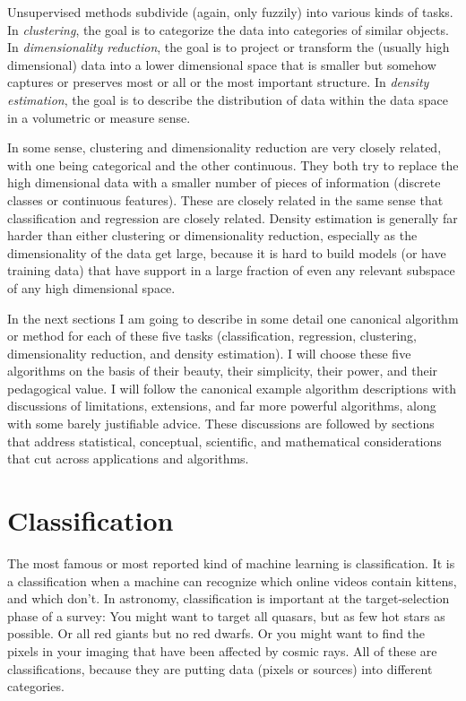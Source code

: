 \documentclass[12pt, twoside, letterpaper]{article}
\begin{document}
Unsupervised methods subdivide (again, only fuzzily) into various
kinds of tasks.
In \emph{clustering}, the goal is to categorize the data into categories
of similar objects.
In \emph{dimensionality reduction}, the goal is to project or
transform the (usually high dimensional) data into a lower dimensional
space that is smaller but somehow captures or preserves most or all or
the most important structure.
In \emph{density estimation}, the goal is to describe the distribution
of data within the data space in a volumetric or measure sense.

In some sense, clustering and dimensionality reduction are very closely
related, with one being categorical and the other continuous.
They both try to replace the high dimensional data with a smaller number of
pieces of information (discrete classes or continuous features).
These are closely related in the
same sense that classification and regression are closely related.
Density estimation is generally far harder than either clustering
or dimensionality reduction, especially as the dimensionality of the
data get large, because it is hard to build models (or have training
data) that have support in a large fraction of even any relevant
subspace of any high dimensional space.

In the next sections I am going to describe in some detail one
canonical algorithm or method for each of these five tasks
(classification, regression, clustering, dimensionality reduction,
and density estimation).
I will choose these five algorithms on the basis of their beauty, their
simplicity, their power, and their pedagogical value.
I will follow the canonical example algorithm descriptions with discussions
of limitations, extensions, and far more powerful algorithms, along
with some barely justifiable advice.
These discussions are followed by sections that address statistical,
conceptual, scientific, and mathematical considerations that cut
across applications and algorithms.

\section{Classification}

The most famous or most reported kind of machine learning is classification.
It is a classification when a machine can recognize which online videos
contain kittens, and which don't. In astronomy, classification is important
at the target-selection phase of a survey: You might want to target all
quasars, but as few hot stars as possible. Or all red giants but no red
dwarfs. Or you might want to find the pixels in your imaging that have been
affected by cosmic rays. All of these are classifications, because they
are putting data (pixels or sources) into different categories.
\end{document}
